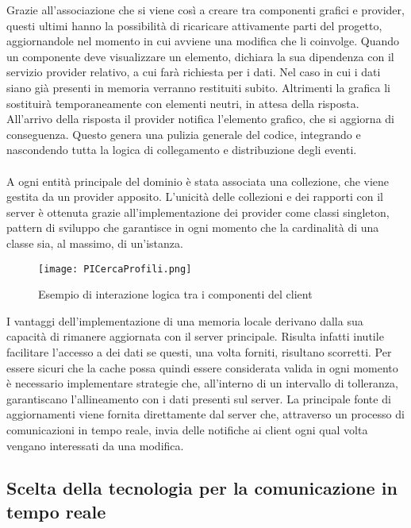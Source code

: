 Grazie all'associazione che si viene così a creare tra componenti grafici e provider,
questi ultimi hanno la possibilità di ricaricare attivamente parti del progetto, 
aggiornandole nel momento in cui avviene una modifica che li coinvolge.
Quando un componente deve visualizzare un elemento,
dichiara la sua dipendenza con il servizio provider relativo, 
a cui farà richiesta per i dati.
Nel caso in cui i dati siano già presenti in memoria verranno restituiti subito.
Altrimenti la grafica li sostituirà temporaneamente con elementi neutri,
in attesa della risposta.
All'arrivo della risposta il provider notifica l'elemento grafico, 
che si aggiorna di conseguenza.
Questo genera una pulizia generale del codice,
integrando e nascondendo tutta la logica di collegamento e distribuzione degli eventi.\\
\\
A ogni entità principale del dominio è stata associata una collezione,
che viene gestita da un provider apposito.
L'unicità delle collezioni e dei rapporti con il server è ottenuta 
grazie all'implementazione dei provider come classi singleton,
pattern di sviluppo che garantisce in ogni momento
che la cardinalità di una classe sia, al massimo, di un'istanza.
\begin{figure}[h!]
    \centering
    \texttt{[image: PICercaProfili.png]}
    \caption{Esempio di interazione logica tra i componenti del client}
\end{figure}
\clearpage
I vantaggi dell'implementazione di una memoria locale
derivano dalla sua capacità di rimanere aggiornata con il server principale.
Risulta infatti inutile facilitare l'accesso a dei dati 
se questi, una volta forniti, risultano scorretti.
Per essere sicuri che la cache possa quindi essere considerata valida in ogni momento
è necessario implementare strategie che, 
all'interno di un intervallo di tolleranza,
garantiscano l'allineamento con i dati presenti sul server.
La principale fonte di aggiornamenti viene fornita direttamente dal server che,
attraverso un processo di comunicazioni in tempo reale,
invia delle notifiche ai client ogni qual volta vengano interessati da una modifica.

\subsection{Scelta della tecnologia per la comunicazione in tempo reale}

